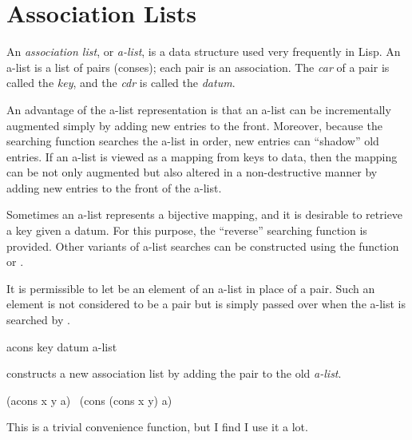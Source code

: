 \section{Association Lists}

An {\it association list}, or {\it a-list}, is a data structure
used very frequently in Lisp.  An a-list is a list of pairs (conses);
each pair is an association.  The {\it car} of a pair is called the {\it key},
and the {\it cdr} is called the {\it datum}.

An advantage of the a-list representation is that an a-list can be
incrementally augmented simply by adding new entries to the front.
Moreover, because the searching function  searches the
a-list in order, new entries can ``shadow'' old entries.  If an a-list is
viewed as a mapping from keys to data, then the mapping can be not only
augmented but also altered in a non-destructive manner by adding new
entries to the front of the a-list.

Sometimes an a-list represents a bijective mapping, and it is desirable
to retrieve a key given a datum.  For this purpose, the ``reverse'' searching
function  is provided.  Other variants of a-list searches
can be constructed using the function  or .

It is permissible to let {\false} be an element of an a-list in place of
a pair.  Such an element is not considered to be a pair but is simply
passed over when the a-list is searched by .

\begin{defun}[Function]
acons key datum a-list

 constructs a new association list by adding the pair
 to the old {\it a-list}.
\begin{lisp}
(acons x y a) \EQ\ (cons (cons x y) a)
\end{lisp}
\begin{newer}
This is a trivial convenience function, but I find I use it a lot.
\end{newer}
\end{defun}

\newpage%

